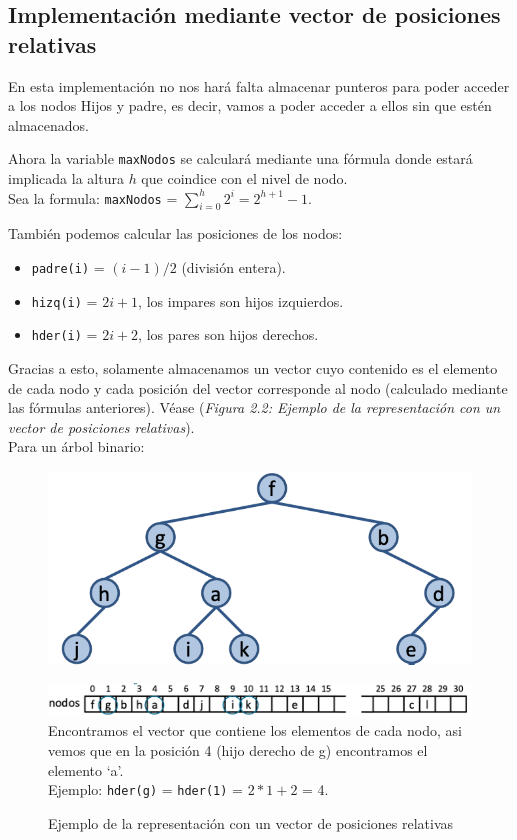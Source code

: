 \subsection{Implementación mediante vector de posiciones relativas}
En esta implementación no nos hará falta almacenar punteros para poder acceder a los nodos Hijos y padre, es decir, vamos a poder acceder a ellos sin que estén almacenados.

Ahora la variable \texttt{maxNodos} se calculará mediante una fórmula donde estará implicada la altura \(h\) que coindice con el nivel de nodo.\\
Sea la formula: \texttt{maxNodos} = \(\sum_{i=0}^{h} 2^i = 2^{h+1}-1\).

También podemos calcular las posiciones de los nodos:
\begin{itemize}
  \item \texttt{padre(i)} = \((i-1)/2\) (división entera).
  \item \texttt{hizq(i)} = \(2i+1\), los impares son hijos izquierdos.
  \item \texttt{hder(i)} = \(2i+2\), los pares son hijos derechos.
\end{itemize}

Gracias a esto, solamente almacenamos un vector cuyo contenido es el elemento de cada nodo y cada posición del vector corresponde al nodo (calculado mediante las fórmulas anteriores).
Véase (\textit{Figura 2.2: Ejemplo de la representación con un vector de posiciones relativas}).
\\
Para un árbol binario:
\begin{figure}[h]
  \begin{minipage}{0.39\textwidth}
    \includegraphics[width=\textwidth]{assets/IVPR.png}
  \end{minipage}
\hfill
\begin{minipage}{0.6\textwidth}
    \includegraphics[width=\textwidth]{assets/IVPR2.png}
    Encontramos el vector que contiene los elementos de cada nodo, asi vemos que en la posición 4 (hijo derecho de g) encontramos el elemento `a'.\\
    Ejemplo: \texttt{hder(g)} = \texttt{hder(1)} = \(2*1+2\) = 4.
\end{minipage}
\caption{Ejemplo de la representación con un vector de posiciones relativas}
\end{figure}

